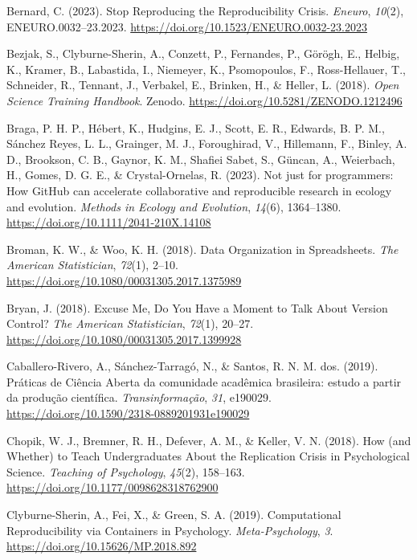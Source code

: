 \documentclass[
  a4paper,
]{book}
\newlength{\cslhangindent}
\newenvironment{CSLReferences}[2] %
 {\begin{list}{}{%
  \setlength{\itemindent}{0pt}
  \setlength{\leftmargin}{0pt}
  \setlength{\parsep}{0pt}
  \ifodd #1
   \setlength{\leftmargin}{\cslhangindent}
   \setlength{\itemindent}{-1\cslhangindent}
  \fi
  \setlength{\itemsep}{#2\baselineskip}}}
 {\end{list}}
\begin{document}
\begin{CSLReferences}{1}{0}
Bernard, C. (2023). Stop {Reproducing} the {Reproducibility Crisis}.
\emph{Eneuro}, \emph{10}(2), ENEURO.0032--23.2023.
\url{https://doi.org/10.1523/ENEURO.0032-23.2023}

Bezjak, S., Clyburne-Sherin, A., Conzett, P., Fernandes, P., Görögh, E.,
Helbig, K., Kramer, B., Labastida, I., Niemeyer, K., Psomopoulos, F.,
Ross-Hellauer, T., Schneider, R., Tennant, J., Verbakel, E., Brinken,
H., \& Heller, L. (2018). \emph{Open {Science Training Handbook}}.
Zenodo. \url{https://doi.org/10.5281/ZENODO.1212496}

Braga, P. H. P., Hébert, K., Hudgins, E. J., Scott, E. R., Edwards, B.
P. M., Sánchez Reyes, L. L., Grainger, M. J., Foroughirad, V.,
Hillemann, F., Binley, A. D., Brookson, C. B., Gaynor, K. M., Shafiei
Sabet, S., Güncan, A., Weierbach, H., Gomes, D. G. E., \&
Crystal-Ornelas, R. (2023). Not just for programmers: How GitHub can
accelerate collaborative and reproducible research in ecology and
evolution. \emph{Methods in Ecology and Evolution}, \emph{14}(6),
1364--1380. \url{https://doi.org/10.1111/2041-210X.14108}

Broman, K. W., \& Woo, K. H. (2018). Data Organization in Spreadsheets.
\emph{The American Statistician}, \emph{72}(1), 2--10.
\url{https://doi.org/10.1080/00031305.2017.1375989}

Bryan, J. (2018). Excuse Me, Do You Have a Moment to Talk About Version
Control? \emph{The American Statistician}, \emph{72}(1), 20--27.
\url{https://doi.org/10.1080/00031305.2017.1399928}

Caballero-Rivero, A., Sánchez-Tarragó, N., \& Santos, R. N. M. dos.
(2019). {Pr{á}ticas de Ci{ê}ncia Aberta da comunidade acad{ê}mica
brasileira: estudo a partir da produ{ç}{ã}o cient{í}fica}.
\emph{Transinforma{ç}{ã}o}, \emph{31}, e190029.
\url{https://doi.org/10.1590/2318-0889201931e190029}

Chopik, W. J., Bremner, R. H., Defever, A. M., \& Keller, V. N. (2018).
How (and {Whether}) to {Teach Undergraduates About} the {Replication
Crisis} in {Psychological Science}. \emph{Teaching of Psychology},
\emph{45}(2), 158--163. \url{https://doi.org/10.1177/0098628318762900}

Clyburne-Sherin, A., Fei, X., \& Green, S. A. (2019). Computational
{Reproducibility} via {Containers} in {Psychology}.
\emph{Meta-Psychology}, \emph{3}.
\url{https://doi.org/10.15626/MP.2018.892}


\end{CSLReferences}
\end{document}

